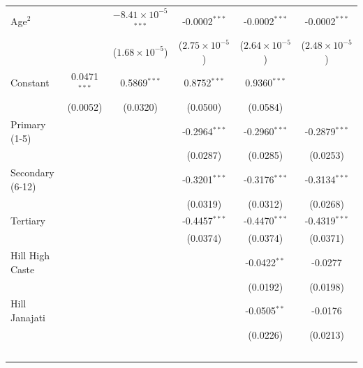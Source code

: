 \begin{tabular}{lccccc}
   Age$^2$                           &                 & $-8.41\times 10^{-5}$$^{***}$  & -0.0002$^{***}$         & -0.0002$^{***}$         & -0.0002$^{***}$\\   
                                     &                 & ($1.68\times 10^{-5}$)         & ($2.75\times 10^{-5}$)  & ($2.64\times 10^{-5}$)  & ($2.48\times 10^{-5}$)\\    
   Constant                          & 0.0471$^{***}$  & 0.5869$^{***}$                 & 0.8752$^{***}$          & 0.9360$^{***}$          &   \\   
                                     & (0.0052)        & (0.0320)                       & (0.0500)                & (0.0584)                &   \\   
   Primary (1-5)                     &                 &                                & -0.2964$^{***}$         & -0.2960$^{***}$         & -0.2879$^{***}$\\   
                                     &                 &                                & (0.0287)                & (0.0285)                & (0.0253)\\   
   Secondary (6-12)                  &                 &                                & -0.3201$^{***}$         & -0.3176$^{***}$         & -0.3134$^{***}$\\   
                                     &                 &                                & (0.0319)                & (0.0312)                & (0.0268)\\   
   Tertiary                          &                 &                                & -0.4457$^{***}$         & -0.4470$^{***}$         & -0.4319$^{***}$\\   
                                     &                 &                                & (0.0374)                & (0.0374)                & (0.0371)\\   
   Hill High Caste                   &                 &                                &                         & -0.0422$^{**}$          & -0.0277\\   
                                     &                 &                                &                         & (0.0192)                & (0.0198)\\   
   Hill Janajati                     &                 &                                &                         & -0.0505$^{**}$          & -0.0176\\   
                                     &                 &                                &                         & (0.0226)                & (0.0213)\\   
$$
\end{tabular}
